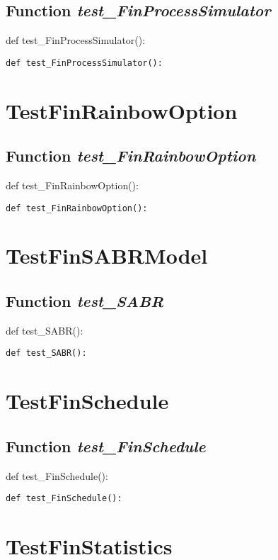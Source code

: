 \documentclass[twoside,11pt]{book}
\begin{document}
\subsection{Function {\it test\_FinProcessSimulator}}
def test\_FinProcessSimulator():

\begin{lstlisting}
def test_FinProcessSimulator():
\end{lstlisting}


\newpage
\section{TestFinRainbowOption}

\subsection{Function {\it test\_FinRainbowOption}}
def test\_FinRainbowOption():

\begin{lstlisting}
def test_FinRainbowOption():
\end{lstlisting}


\newpage
\section{TestFinSABRModel}

\subsection{Function {\it test\_SABR}}
def test\_SABR():

\begin{lstlisting}
def test_SABR():
\end{lstlisting}


\newpage
\section{TestFinSchedule}

\subsection{Function {\it test\_FinSchedule}}
def test\_FinSchedule():

\begin{lstlisting}
def test_FinSchedule():
\end{lstlisting}


\newpage
\section{TestFinStatistics}
\end{document}
